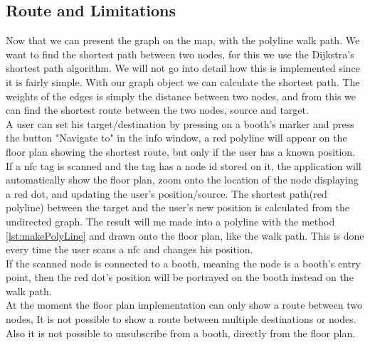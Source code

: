 \subsection*{Route and Limitations}
Now that we can present the graph on the map, with the polyline walk path. We want to find the shortest path between two nodes, for this we use the Dijkstra's shortest path algorithm. We will not go into detail how this is implemented since it is fairly simple. With our graph object we can calculate the shortest path. The weights of the edges is simply the distance between two nodes, and from this we can find the shortest route between the two nodes, source and target.\\ 
A user can set his target/destination by pressing on a booth's marker and press the button "Navigate to" in the info window, a red polyline will appear on the floor plan showing the shortest route, but only if the user has a known position.\\
If a \ac{nfc} tag is scanned and the tag has a node id stored on it, the application will automatically show the floor plan, zoom onto the location of the node displaying a red dot, and updating the user's position/source. The shortest path(red polyline) between the target and the user's new position is calculated from the undirected graph. The result will me made into a polyline with the method  \autoref{lst:makePolyLine} and drawn onto the floor plan, like the walk path. This is done every time the user scans a \ac{nfc} and changes his position.\\
If the scanned node is connected to a booth, meaning the node is a booth's entry point, then the red dot's position will be portrayed on the booth instead on the walk path.\\ 
At the moment the floor plan implementation can only show a route between two nodes, It is not possible to show a route between multiple destinations or nodes. Also it is not possible to unsubscribe from a booth, directly from the floor plan.







	
